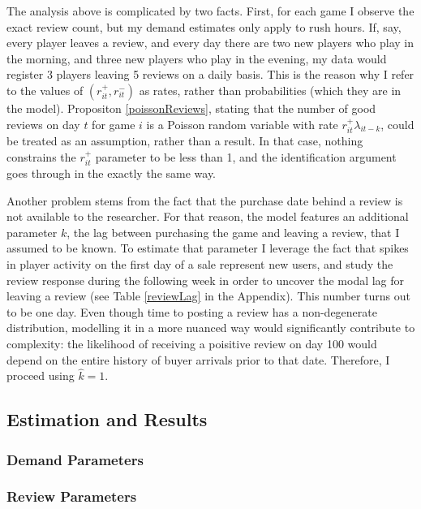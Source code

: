 \documentclass[12pt,pagebackref]{article}
\begin{document}
The analysis above is complicated by two facts. First, for each game I
observe the exact review count, but my demand estimates only apply to
rush hours. If, say, every player leaves a review, and every day there
are two new players who play in the morning, and three new players who
play in the evening, my data would register 3 players leaving 5 reviews
on a daily basis. This is the reason why I refer to the values of
\((r_{it}^+, r_{it}^-)\) as rates, rather than probabilities (which they
are in the model). Propositon \ref{poissonReviews}, stating that the
number of good reviews on day \(t\) for game \(i\) is a Poisson random
variable with rate \(r_{it}^+\lambda_{it-k}\), could be treated as an
assumption, rather than a result. In that case, nothing constrains the
\(r_{it}^+\) parameter to be less than 1, and the identification
argument goes through in the exactly the same way.

Another problem stems from the fact that the purchase date behind a
review is not available to the researcher. For that reason, the model
features an additional parameter \(k\), the lag between purchasing the
game and leaving a review, that I assumed to be known. To estimate that
parameter I leverage the fact that spikes in player activity on the
first day of a sale represent new users, and study the review response
during the following week in order to uncover the modal lag for leaving
a review (see Table \ref{reviewLag} in the Appendix). This number turns
out to be one day. Even though time to posting a review has a
non-degenerate distribution, modelling it in a more nuanced way would
significantly contribute to complexity: the likelihood of receiving a
poisitive review on day 100 would depend on the entire history of buyer
arrivals prior to that date. Therefore, I proceed using \(\hat k = 1\).

\hypertarget{estimation-and-results}{%
\subsection{Estimation and Results}\label{estimation-and-results}}

\hypertarget{demand-parameters-1}{%
\subsubsection{Demand Parameters}\label{demand-parameters-1}}

\hypertarget{review-parameters-1}{%
\subsubsection{Review Parameters}\label{review-parameters-1}}
\end{document}
